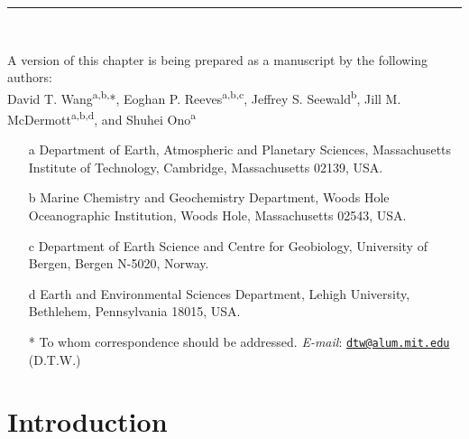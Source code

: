 \vspace*{\fill}

\noindent \rule{\textwidth}{0.4pt}\\

{\small
	
	\noindent A version of this chapter is being prepared as a manuscript by the following authors:\\
	
	\noindent David T. Wang\textsuperscript{a,b,}*, Eoghan P.
	Reeves\textsuperscript{a,b,c}, Jeffrey S. Seewald\textsuperscript{b},
	Jill M. McDermott\textsuperscript{a,b,d}, and Shuhei
	Ono\textsuperscript{a}\\
	
	\begin{itemize}[labelsep*=1pt, leftmargin=10pt]
		\item[\tss a] Department of Earth, Atmospheric and Planetary Sciences, Massachusetts Institute of Technology, Cambridge, Massachusetts 02139, USA.
		\item[\tss b] Marine Chemistry and Geochemistry Department, Woods Hole Oceanographic Institution, Woods Hole, Massa\-chu\-setts 02543, USA.
		\item[\tss c] Department of Earth Science and Centre for Geobiology, University of Bergen, Bergen N-5020, Norway.
		\item[\tss d] Earth and Environmental Sciences Department, Lehigh University, Bethlehem, Pennsylvania 18015, USA.
		\item[*] To whom correspondence should be addressed. {\itshape E-mail}: \href{mailto:dtw@alum.mit.edu}{\nolinkurl{dtw@alum.mit.edu}} (D.T.W.)
	\end{itemize}

}

\clearpage

\section{Introduction} \label{sec:3:intro}

